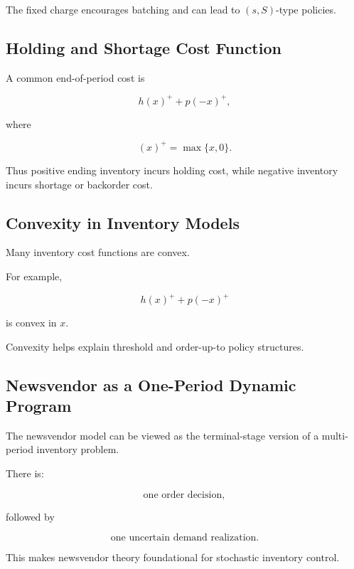 The fixed charge encourages batching and can lead to \((s,S)\)-type
policies.

\subsection{Holding and Shortage Cost Function}
\label{subsec:inventory-holding-shortage-function}

A common end-of-period cost is

\[
\boxed{
h(x)^+
+
p(-x)^+,
}
\]

where

\[
(x)^+
=
\max\{x,0\}.
\]

Thus positive ending inventory incurs holding cost, while negative
inventory incurs shortage or backorder cost.

\subsection{Convexity in Inventory Models}
\label{subsec:inventory-convexity}

Many inventory cost functions are convex.

For example,

\[
\boxed{
h(x)^+
+
p(-x)^+
}
\]

is convex in \(x\).

Convexity helps explain threshold and order-up-to policy structures.

\subsection{Newsvendor as a One-Period Dynamic Program}
\label{subsec:newsvendor-one-period-dp}

The newsvendor model can be viewed as the terminal-stage version of a
multi-period inventory problem.

There is:

\[
\boxed{
\text{one order decision},
}
\]

followed by

\[
\boxed{
\text{one uncertain demand realization}.
}
\]

This makes newsvendor theory foundational for stochastic inventory
control.

